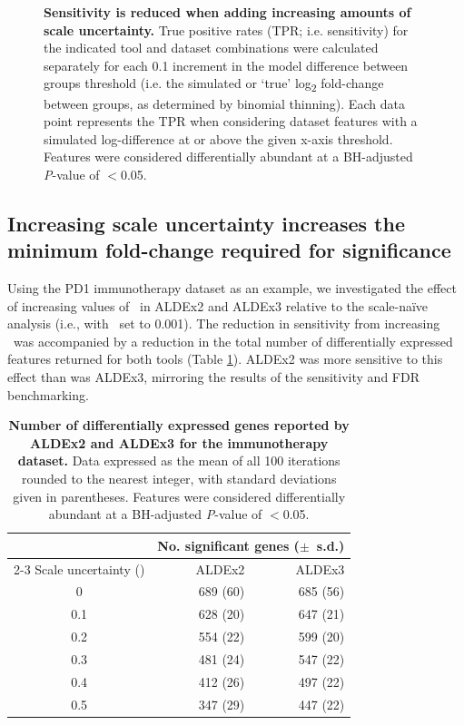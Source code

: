 \documentclass[10pt,letterpaper]{article}
\begin{document}
\begin{figure}[H]
    \centering
    \caption{\textbf{Sensitivity is reduced when adding increasing amounts of scale uncertainty.} True positive rates (TPR; i.e. sensitivity) for the indicated tool and dataset combinations were calculated separately for each 0.1 increment in the model difference between groups threshold (i.e. the simulated or `true' log\textsubscript{2} fold-change between groups, as determined by binomial thinning). Each data point represents the TPR when considering dataset features with a simulated log-difference at or above the given x-axis threshold. Features were considered differentially abundant at a BH-adjusted \textit{P}-value of $<$0.05.}
    \label{fig:TPR}
\end{figure}


\subsection*{Increasing scale uncertainty increases the minimum fold-change required for significance}
Using the PD1 immunotherapy dataset as an example, we investigated the effect of increasing values of \textgamma~in ALDEx2 and ALDEx3 relative to the scale-na\"ive analysis (i.e., with \textgamma~set to 0.001). The reduction in sensitivity from increasing \textgamma~was accompanied by a reduction in the total number of differentially expressed features returned for both tools (Table \ref{tab:sigGenes}). ALDEx2 was more sensitive to this effect than was ALDEx3, mirroring the results of the sensitivity and FDR benchmarking. 

\begin{table}[H]
    \caption{\textbf{Number of differentially expressed genes reported by ALDEx2 and ALDEx3 for the immunotherapy dataset.} Data expressed as the mean of all 100 iterations rounded to the nearest integer, with standard deviations given in parentheses. Features were considered differentially abundant at a BH-adjusted \textit{P}-value of $<$0.05.}
    \centering
    \begin{tabular}{crr}
        \toprule
        & \multicolumn{2}{c}{No. significant genes ($\pm$~s.d.)}\\
        \cmidrule(lr){2-3}
        Scale uncertainty (\textgamma{}) & ALDEx2 & ALDEx3\\
        \midrule
        0 & 689 (60) & 685 (56)\\
        0.1 & 628 (20) & 647 (21) \\
        0.2 & 554 (22) & 599 (20) \\
        0.3 & 481 (24) & 547 (22) \\
        0.4 & 412 (26) & 497 (22) \\
        0.5 & 347 (29) & 447 (22) \\
        \bottomrule
    \end{tabular}
    \label{tab:sigGenes}
\end{table}
\end{document}
